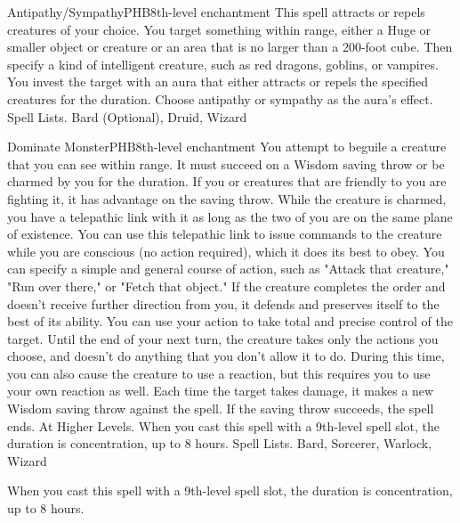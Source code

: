 \begin{spell}{Antipathy/Sympathy}{PHB}{8th-level enchantment}
{
}
This spell attracts or repels creatures of your choice. You target something within range, either a Huge or smaller object or creature or an area that is no larger than a 200-foot cube. Then specify a kind of intelligent creature, such as red dragons, goblins, or vampires. You invest the target with an aura that either attracts or repels the specified creatures for the duration. Choose antipathy or sympathy as the aura’s effect.
Spell Lists. Bard (Optional), Druid, Wizard
\end{spell}

\begin{spell}{Dominate Monster}{PHB}{8th-level enchantment}
{
}
You attempt to beguile a creature that you can see within range. It must succeed on a Wisdom saving throw or be charmed by you for the duration. If you or creatures that are friendly to you are fighting it, it has advantage on the saving throw.
While the creature is charmed, you have a telepathic link with it as long as the two of you are on the same plane of existence. You can use this telepathic link to issue commands to the creature while you are conscious (no action required), which it does its best to obey. You can specify a simple and general course of action, such as "Attack that creature," "Run over there," or "Fetch that object." If the creature completes the order and doesn’t receive further direction from you, it defends and preserves itself to the best of its ability.
You can use your action to take total and precise control of the target. Until the end of your next turn, the creature takes only the actions you choose, and doesn’t do anything that you don’t allow it to do. During this time, you can also cause the creature to use a reaction, but this requires you to use your own reaction as well.
Each time the target takes damage, it makes a new Wisdom saving throw against the spell. If the saving throw succeeds, the spell ends.
At Higher Levels. When you cast this spell with a 9th-level spell slot, the duration is concentration, up to 8 hours.
Spell Lists. Bard, Sorcerer, Warlock, Wizard

 When you cast this spell with a 9th-level spell slot, the duration is concentration, up to 8 hours.
\end{spell}

